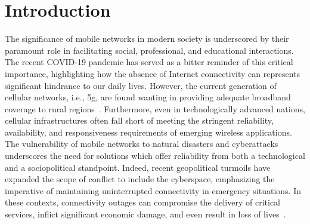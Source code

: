 \chapter{Introduction}

The significance of mobile networks in modern society is underscored by their paramount role in facilitating social, professional, and educational interactions. The recent COVID-19 pandemic has served as a bitter reminder of this critical importance, highlighting how the absence of Internet connectivity can represents significant hindrance to our daily lives.
However, the current generation of cellular networks, i.e., \gls{5g}, are found wanting in providing adequate broadband coverage to rural regions~\cite{yaacoub2020key}. Furthermore, even in technologically advanced nations, cellular infrastructures often fall short of meeting the stringent reliability, availability, and responsiveness requirements of emerging wireless applications. The vulnerability of mobile networks to natural disasters and cyberattacks underscores the need for solutions which offer reliability from both a technological and a sociopolitical standpoint.
Indeed, recent geopolitical turmoils have expanded the scope of conflict to include the cyberspace, emphasizing the imperative of maintaining uninterrupted connectivity in emergency situations. In these contexts, connectivity outages can compromise the delivery of critical services, inflict significant economic damage, and even result in loss of lives~\cite{internet_ukr_afg}.

